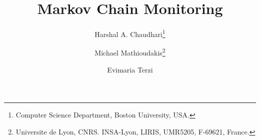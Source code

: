 \documentclass[twoside,leqno,twocolumn]{article}
\begin{document}
\title{\Large Markov Chain Monitoring}

\author{Harshal A. Chaudhari\thanks{Computer Science Department, Boston University, USA.} \\
\and
Michael Mathioudakis\thanks{Universite de Lyon, CNRS.
INSA-Lyon, LIRIS, UMR5205, F-69621, France.}
\and
Evimaria Terzi\footnotemark[1]%
}
\date{}


\maketitle















%
% 







\clearpage


\end{document}
